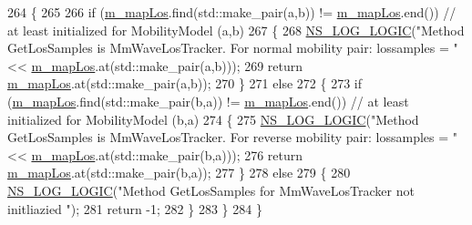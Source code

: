 \begin{DoxyCode}
264 \{
265 
266         \textcolor{keywordflow}{if} (\hyperlink{classns3_1_1MmWaveLosTracker_a1ccd3a19ade5ca4b1e94bd113c593cd3}{m\_mapLos}.find(std::make\_pair(a,b)) != \hyperlink{classns3_1_1MmWaveLosTracker_a1ccd3a19ade5ca4b1e94bd113c593cd3}{m\_mapLos}.end()) \textcolor{comment}{// at least initialized
       for MobilityModel (a,b)}
267         \{
268                 \hyperlink{group__logging_ga88acd260151caf2db9c0fc84997f45ce}{NS\_LOG\_LOGIC}(\textcolor{stringliteral}{"Method GetLosSamples is MmWaveLosTracker. For normal mobility
       pair: lossamples = "} << \hyperlink{classns3_1_1MmWaveLosTracker_a1ccd3a19ade5ca4b1e94bd113c593cd3}{m\_mapLos}.at(std::make\_pair(a,b)));
269                 \textcolor{keywordflow}{return} \hyperlink{classns3_1_1MmWaveLosTracker_a1ccd3a19ade5ca4b1e94bd113c593cd3}{m\_mapLos}.at(std::make\_pair(a,b));
270         \} 
271         \textcolor{keywordflow}{else}
272         \{
273                 \textcolor{keywordflow}{if} (\hyperlink{classns3_1_1MmWaveLosTracker_a1ccd3a19ade5ca4b1e94bd113c593cd3}{m\_mapLos}.find(std::make\_pair(b,a)) != \hyperlink{classns3_1_1MmWaveLosTracker_a1ccd3a19ade5ca4b1e94bd113c593cd3}{m\_mapLos}.end()) \textcolor{comment}{// at least
       initialized for MobilityModel (b,a)}
274                 \{
275                         \hyperlink{group__logging_ga88acd260151caf2db9c0fc84997f45ce}{NS\_LOG\_LOGIC}(\textcolor{stringliteral}{"Method GetLosSamples is MmWaveLosTracker. For reverse
       mobility pair: lossamples = "} << \hyperlink{classns3_1_1MmWaveLosTracker_a1ccd3a19ade5ca4b1e94bd113c593cd3}{m\_mapLos}.at(std::make\_pair(b,a)));
276                         \textcolor{keywordflow}{return} \hyperlink{classns3_1_1MmWaveLosTracker_a1ccd3a19ade5ca4b1e94bd113c593cd3}{m\_mapLos}.at(std::make\_pair(b,a));
277                 \}
278                 \textcolor{keywordflow}{else}
279                 \{
280                         \hyperlink{group__logging_ga88acd260151caf2db9c0fc84997f45ce}{NS\_LOG\_LOGIC}(\textcolor{stringliteral}{"Method GetLosSamples for MmWaveLosTracker not initliazied
      "});
281                         \textcolor{keywordflow}{return} -1;
282                 \}
283         \}
284 \}
\end{DoxyCode}
